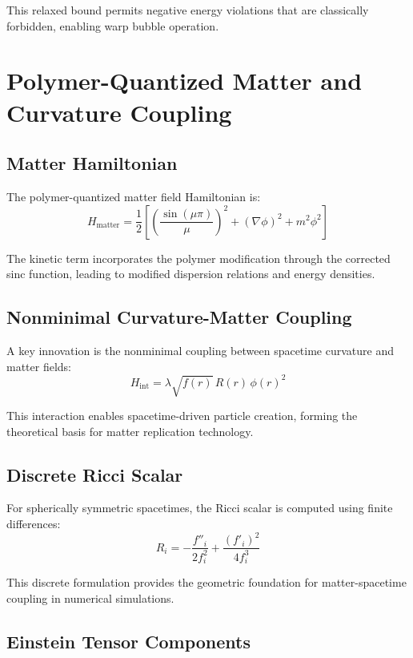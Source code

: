 \documentclass[11pt]{article}
\begin{document}
This relaxed bound permits negative energy violations that are classically forbidden, enabling warp bubble operation.

\section{Polymer-Quantized Matter and Curvature Coupling}

\subsection{Matter Hamiltonian}

The polymer-quantized matter field Hamiltonian is:
\begin{equation}
H_{\text{matter}} = \frac{1}{2}\left[\left(\frac{\sin(\mu\pi)}{\mu}\right)^2 + (\nabla\phi)^2 + m^2\phi^2\right]
\end{equation}

The kinetic term incorporates the polymer modification through the corrected sinc function, leading to modified dispersion relations and energy densities.

\subsection{Nonminimal Curvature-Matter Coupling}

A key innovation is the nonminimal coupling between spacetime curvature and matter fields:
\begin{equation}
H_{\text{int}} = \lambda\sqrt{f(r)}\,R(r)\,\phi(r)^2
\end{equation}

This interaction enables spacetime-driven particle creation, forming the theoretical basis for matter replication technology.

\subsection{Discrete Ricci Scalar}

For spherically symmetric spacetimes, the Ricci scalar is computed using finite differences:
\begin{equation}
R_i = -\frac{f''_i}{2f_i^2} + \frac{(f'_i)^2}{4f_i^3}
\end{equation}

This discrete formulation provides the geometric foundation for matter-spacetime coupling in numerical simulations.

\subsection{Einstein Tensor Components}
\end{document}
